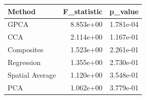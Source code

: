 \begin{tabular}{lrr}
\toprule
Method & F_statistic & p_value \\
\midrule
GPCA & 8.853e+00 & 1.781e-04 \\
CCA & 2.114e+00 & 1.167e-01 \\
Composites & 1.523e+00 & 2.261e-01 \\
Regression & 1.355e+00 & 2.730e-01 \\
Spatial Average & 1.120e+00 & 3.548e-01 \\
PCA & 1.062e+00 & 3.779e-01 \\
\bottomrule
\end{tabular}
